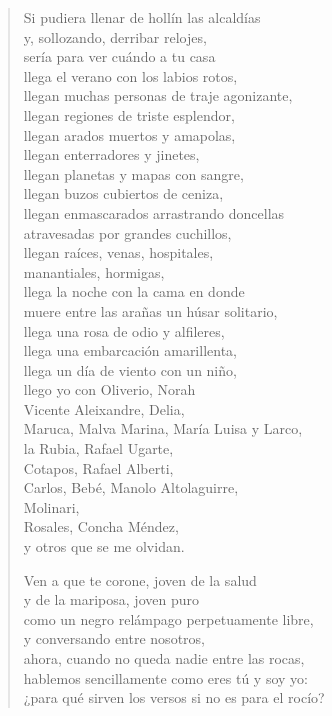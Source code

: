 \documentclass[12pt]{article}
\begin{document}
\begin{verse}
Si pudiera llenar de hollín las alcaldías\\
y, sollozando, derribar relojes,\\
sería para ver cuándo a tu casa\\
llega el verano con los labios rotos,\\
llegan muchas personas de traje agonizante,\\
llegan regiones de triste esplendor,\\
llegan arados muertos y amapolas,\\
llegan enterradores y jinetes,\\
llegan planetas y mapas con sangre,\\
llegan buzos cubiertos de ceniza,\\
llegan enmascarados arrastrando doncellas\\
atravesadas por grandes cuchillos,\\
llegan raíces, venas, hospitales,\\
manantiales, hormigas,\\
llega la noche con la cama en donde\\
muere entre las arañas un húsar solitario,\\
llega una rosa de odio y alfileres,\\
llega una embarcación amarillenta,\\
llega un día de viento con un niño,\\
llego yo con Oliverio, Norah\\
Vicente Aleixandre, Delia,\\
Maruca, Malva Marina, María Luisa y Larco,\\
la Rubia, Rafael Ugarte,\\
Cotapos, Rafael Alberti,\\
Carlos, Bebé, Manolo Altolaguirre,\\
Molinari,\\
Rosales, Concha Méndez,\\
y otros que se me olvidan.  

Ven a que te corone, joven de la salud\\
y de la mariposa, joven puro\\
como un negro relámpago perpetuamente libre,\\
y conversando entre nosotros,\\
ahora, cuando no queda nadie entre las rocas,\\
hablemos sencillamente como eres tú y soy yo:\\
¿para qué sirven los versos si no es para el rocío?  


\end{verse}
\end{document}
